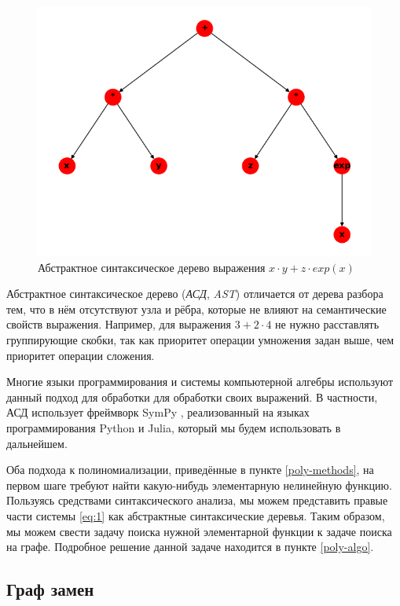 \begin{figure}[h!]
    \centering
    \includegraphics{chapters/images/AST.png}
    \caption{Абстрактное синтаксическое дерево выражения $x \cdot y + z \cdot exp(x)$}
    \label{fig:AST}
\end{figure}

Абстрактное синтаксическое дерево (\textit{АСД}, \textit{AST}) отличается от дерева разбора тем, что в нём отсутствуют узла и рёбра, которые не влияют на семантические свойств выражения. Например, для выражения $3 + 2 \cdot 4$ не нужно расставлять группирующие скобки, так как приоритет операции умножения задан выше, чем приоритет операции сложения.

Многие языки программирования и системы компьютерной алгебры используют данный подход для обработки для обработки своих выражений. В частности, АСД использует фреймворк SymPy \cite{SymPy}, реализованный на языках программирования Python и Julia, который мы будем использовать в дальнейшем.

Оба подхода к полиномиализации, приведённые в пункте \ref{poly-methods}, на первом шаге требуют найти какую-нибудь элементарную нелинейную функцию. Пользуясь средствами синтаксического анализа, мы можем представить правые части системы \ref{eq:1} как абстрактные синтаксические деревья. Таким образом, мы можем свести задачу поиска нужной элементарной функции к задаче поиска на графе. Подробное решение данной задаче находится в пункте \ref{poly-algo}.

\subsection{Граф замен} \label{replacement-graph-section}


